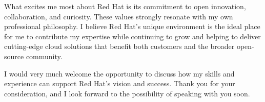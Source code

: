{What excites me most about Red Hat is its commitment to open innovation, collaboration, and curiosity. These values strongly resonate with my own professional philosophy. I believe Red Hat's unique environment is the ideal place for me to contribute my expertise while continuing to grow and helping to deliver cutting-edge cloud solutions that benefit both customers and the broader open-source community.\par
I would very much welcome the opportunity to discuss how my skills and experience can support Red Hat's vision and success. Thank you for your consideration, and I look forward to the possibility of speaking with you soon.%
}